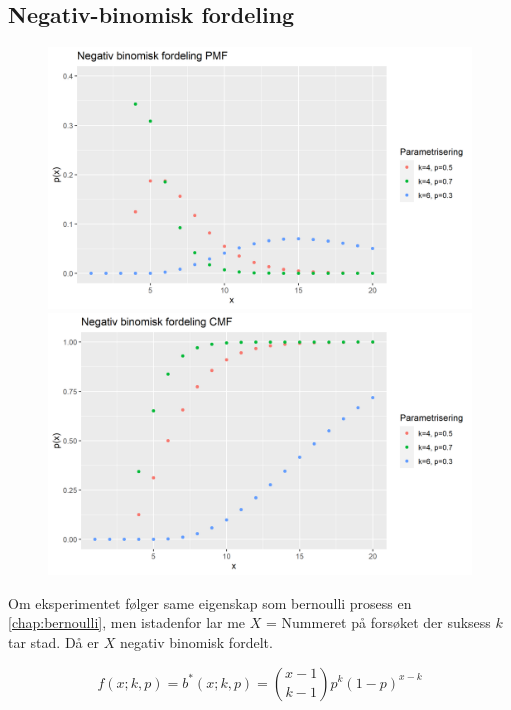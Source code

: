 \subsection{Negativ-binomisk fordeling}
\begin{figure}[H]
  \centering
  \begin{minipage}[b]{0.49\textwidth}
    \includegraphics[width=\textwidth]{bilete/negbinpmf.png}
  \end{minipage}
  \hfill
  \begin{minipage}[b]{0.49\textwidth}
    \includegraphics[width=\textwidth]{bilete/negbincdf.png}
  \end{minipage}
\end{figure}
Om eksperimentet følger same eigenskap som bernoulli prosess en \ref{chap:bernoulli}, men istadenfor lar me $X$ = Nummeret på forsøket der suksess $k$ tar stad. Då er $X$ negativ binomisk fordelt. 

\begin{equation}
    f(x; k, p) = b^*(x; k, p) = \binom{x - 1}{k - 1}p^k (1-p)^{x - k}
\end{equation}

